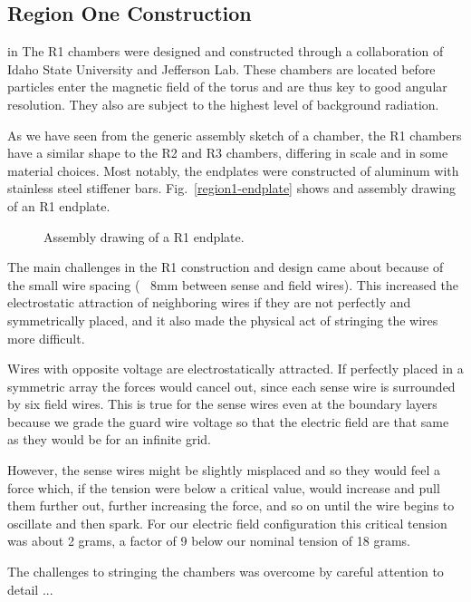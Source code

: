 \subsection{Region One Construction}

 in 
The R1 chambers were designed and constructed through a collaboration 
of Idaho State University and Jefferson Lab.  These 
chambers are located before particles enter the magnetic field of the torus
and are thus key to good angular resolution.  They also are subject to the
highest level of background radiation. 

As we have seen from the generic assembly sketch of a chamber, the R1
chambers have a similar shape to the R2 and R3 chambers, differing in
scale and in some material choices.
Most notably, the endplates were constructed of aluminum with stainless
steel stiffener bars.
Fig.~\ref{region1-endplate} shows and assembly drawing of an R1 endplate.


\begin{figure}[htpb]   
\vspace{7.0cm}

\caption{\small{Assembly drawing of a R1 endplate.}}
\label{region1}
\end{figure}   

The main challenges in the R1 construction and design came about because
of the small wire spacing (~ 8mm between sense and field wires).  This
increased the electrostatic attraction of neighboring wires if they are
not perfectly and symmetrically placed, and it also made the physical act
of stringing the wires more difficult.

Wires with opposite voltage are electrostatically attracted.  If perfectly
placed in a symmetric array the forces would cancel out, since each sense
wire is surrounded by six field wires.  This is true for the sense wires
even at the boundary layers because we grade the guard wire voltage so
that the electric field are that same as they would be for an infinite grid.

However, the sense wires might be slightly misplaced and so they would feel
a force which, if the tension were below a critical value, would increase
and pull them further out, further increasing the force, and so on until 
the wire begins to oscillate and then spark.  For our electric field configuration
this critical tension was about 2 grams, a factor of 9 below our nominal
tension of 18 grams.

The challenges to stringing the chambers was overcome by careful attention to
detail ...


